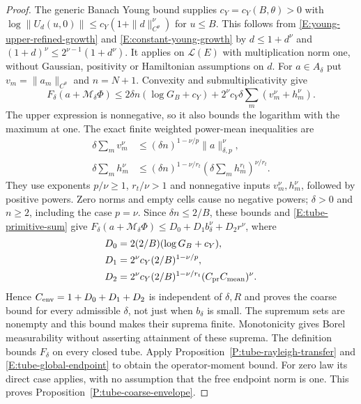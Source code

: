 \begin{proof}
  The generic Banach Young bound supplies $c_Y=c_Y(B,\theta)>0$
  with $\log\|U_d(u,0)\|\le c_Y(1+\|d\|_{C^\theta}^{\nu})$
  for $u\le B$. This follows from
  \eqref{E:young-upper-refined-growth} and
  \eqref{E:constant-young-growth} by
  $d\le1+d^\nu$ and
  $(1+d)^\nu\le2^{\nu-1}(1+d^\nu)$.
  It applies on $\mathcal L(E)$ with multiplication norm one,
  without Gaussian, positivity or Hamiltonian assumptions on $d$.
  For $a\in A_\delta$ put $v_m=\|a_m\|_{C^\theta}$ and
  $n=N+1$. Convexity and submultiplicativity give
  \[
    F_\delta(a+\mathcal M_\delta\Phi)
    \le2\delta n(\log G_B+c_Y)
    +2^\nu c_Y\delta\sum_m(v_m^\nu+h_m^\nu).
  \]
  The upper expression is nonnegative, so it also bounds the
  logarithm with the maximum at one.
  The exact finite weighted power-mean inequalities are
  \begin{align*}
    \delta\sum_m v_m^\nu
    &\le(\delta n)^{1-\nu/p}\|a\|_{\delta,p}^\nu,\\
    \delta\sum_m h_m^\nu
    &\le(\delta n)^{1-\nu/r_t}
    \left(\delta\sum_m h_m^{r_t}\right)^{\nu/r_t}.
  \end{align*}
  They use exponents $p/\nu\ge1$, $r_t/\nu>1$ and
  nonnegative inputs $v_m^\nu,h_m^\nu$, followed by positive powers.
  Zero norms and empty cells cause no negative powers;
  $\delta>0$ and $n\ge2$, including the case $p=\nu$.
  Since $\delta n\le2/B$, these bounds and
  \eqref{E:tube-primitive-sum} give
  $F_\delta(a+\mathcal M_\delta\Phi)
  \le D_0+D_1b_\delta^\nu+D_2r^\nu$, where
  \begin{align*}
    D_0&=2(2/B)(\log G_B+c_Y),\\
    D_1&=2^\nu c_Y(2/B)^{1-\nu/p},\\
    D_2&=2^\nu c_Y(2/B)^{1-\nu/r_t}
    (C_{\rm pr}C_{\rm mean})^\nu .
  \end{align*}
  Hence $C_{\rm env}=1+D_0+D_1+D_2$ is independent of
  $\delta,R$ and proves the coarse bound for every admissible
  $\delta$, not just when $b_\delta$ is small.
  The supremum sets are nonempty and this bound makes their
  suprema finite. Monotonicity gives Borel measurability without
  asserting attainment of these suprema.
  The definition bounds $F_\delta$ on every closed tube.
  Apply Proposition~\ref{P:tube-rayleigh-transfer} and
  \eqref{E:tube-global-endpoint} to obtain the operator-moment bound.
  For zero law its direct case applies, with no assumption that
  the free endpoint norm is one.
  This proves Proposition~\ref{P:tube-coarse-envelope}.
\end{proof}

